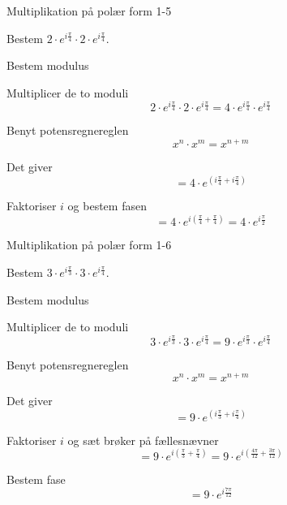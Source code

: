 \documentclass{article}
\begin{document}
\newpage

\begin{exercise}{Multiplikation på polær form 1-5}
	
	Bestem $2 \cdot e^{i \frac{\pi}{4}} \cdot 2 \cdot e^{i \frac{\pi}{4}}$.
	
	
	
	\hint 
	
	Bestem modulus
	
	
	\hint
	
	Multiplicer de to moduli 
	\[
	2 \cdot e^{i \frac{\pi}{4}} \cdot 2 \cdot e^{i \frac{\pi}{4}} = 4 \cdot e^{i \frac{\pi}{4}} \cdot e^{i \frac{\pi}{4}}
	\]
	
	\hint 
	
	Benyt potensregnereglen
	\[
	x^n \cdot x^m = x^{n+m}
	\]
	
	\hint
	
	Det giver
	\[
	=4 \cdot e^{(i \frac{\pi}{4} + i \frac{\pi}{4})}
	\]
	
	\hint
	
	Faktoriser $i$ og bestem fasen
	\[
	= 4 \cdot e^{i( \frac{\pi}{4} +\frac{\pi}{4})} = 4 \cdot e^{i \frac{\pi}{2}}
	\]
	
	
\end{exercise}


\newpage

\begin{exercise}{Multiplikation på polær form 1-6}
	
	Bestem $3 \cdot e^{i \frac{\pi}{3}} \cdot 3 \cdot e^{i \frac{\pi}{4}}$.
	
	
	
	\hint 
	
	Bestem modulus
	
	
	\hint
	
	Multiplicer de to moduli 
	\[
	3 \cdot e^{i \frac{\pi}{3}} \cdot 3 \cdot e^{i \frac{\pi}{4}} = 9 \cdot e^{i \frac{\pi}{3}}  \cdot e^{i \frac{\pi}{4}}
	\]
	
	\hint 
	
	Benyt potensregnereglen
	\[
	x^n \cdot x^m = x^{n+m}
	\]
	
	\hint
	
	Det giver
	\[
	=9 \cdot e^{(i \frac{\pi}{3}+i \frac{\pi}{4})}
	\]
	
	\hint
	
	Faktoriser $i$ og sæt brøker på fællesnævner
	\[
	= 9 \cdot e^{i( \frac{\pi}{3}+ \frac{\pi}{4})} = 9 \cdot e^{i( \frac{4 \pi}{12} + \frac{3\pi}{12})} 
	\]
	
	\hint
	
	Bestem fase
	\[
	= 9 \cdot e^{i\frac{7 \pi}{12}}
	\]
	
	
\end{exercise}
\end{document}
